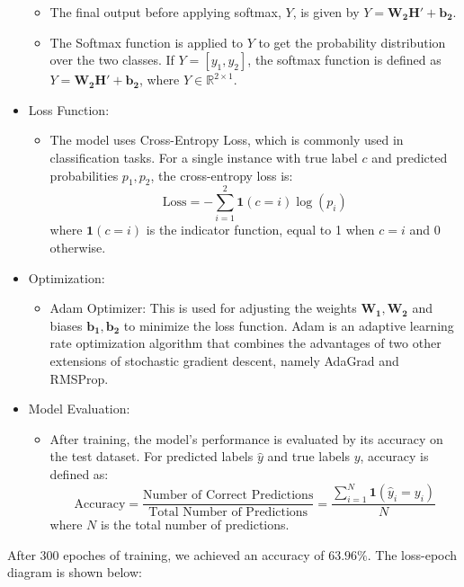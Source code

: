 \documentclass[UTF8]{mcmthesis}
\begin{document}
\begin{itemize}
\begin{itemize}
			\item The final output before applying softmax, \( Y \), is given by \( Y = \mathbf{W_2} \mathbf{H'} + \mathbf{b_2} \).
			\item The Softmax function is applied to \( Y \) to get the probability distribution over the two classes. If \( Y = [y_1, y_2] \), the softmax function is defined as \( Y = \mathbf{W_2} \mathbf{H'} + \mathbf{b_2} \), where \( Y \in \mathbb{R}^{2 \times 1} \).
		\end{itemize}
		\item Loss Function:
		\begin{itemize}
			\item The model uses Cross-Entropy Loss, which is commonly used in classification tasks. For a single instance with true label \( c \) and predicted probabilities \( p_1, p_2 \), the cross-entropy loss is:
			 \[ \text{Loss} = -\sum_{i=1}^{2} \mathbf{1}(c = i) \log(p_i) \]
			where \( \mathbf{1}(c = i) \) is the indicator function, equal to 1 when \( c = i \) and 0 otherwise.
		\end{itemize}
		\item Optimization:
		\begin{itemize}
			\item Adam Optimizer: This is used for adjusting the weights \( \mathbf{W_1}, \mathbf{W_2} \) and biases \( \mathbf{b_1}, \mathbf{b_2} \) to minimize the loss function. Adam is an adaptive learning rate optimization algorithm that combines the advantages of two other extensions of stochastic gradient descent, namely AdaGrad and RMSProp.
		\end{itemize}
		\item Model Evaluation:
		\begin{itemize}
			\item After training, the model's performance is evaluated by its accuracy on the test dataset. For predicted labels \( \hat{y} \) and true labels \( y \), accuracy is defined as:
			\[ \text{Accuracy} = \frac{\text{Number of Correct Predictions}}{\text{Total Number of Predictions}} = \frac{\sum_{i=1}^{N} \mathbf{1}(\hat{y}_i = y_i)}{N} \]
			where \( N \) is the total number of predictions.
		\end{itemize}
	\end{itemize}
	
	After 300 epoches of training, we achieved an accuracy of $63.96\%$. The loss-epoch diagram is shown below:
		
\end{document}
